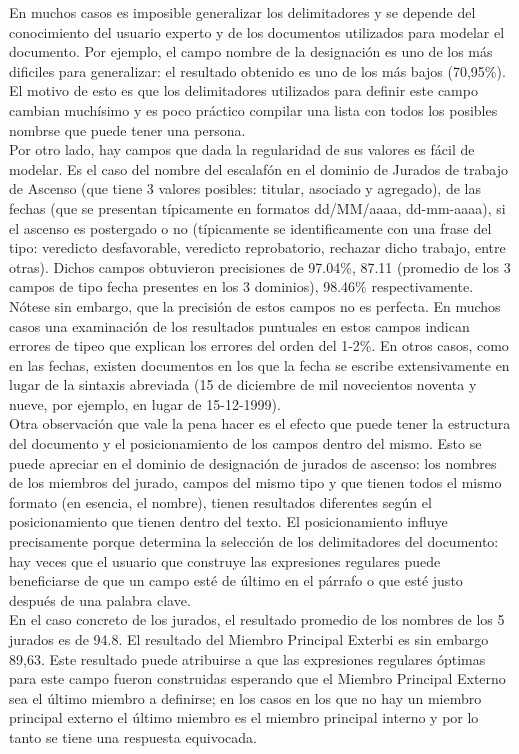 En muchos casos es imposible generalizar los delimitadores y se depende del conocimiento del usuario experto y de los documentos utilizados para modelar el documento. Por ejemplo, el campo nombre de la designación es uno de los más dificiles para generalizar: el resultado obtenido es uno de los más bajos (70,95\%). El motivo de esto es que los delimitadores utilizados para definir este campo cambian muchísimo y es poco práctico compilar una lista con todos los posibles nombrse que puede tener una persona. \\

Por otro lado, hay campos que dada la regularidad de sus valores es fácil de modelar. Es el caso del nombre del escalafón en el dominio de Jurados de trabajo de Ascenso (que tiene 3 valores posibles: titular, asociado y agregado), de las fechas (que se presentan típicamente en formatos dd/MM/aaaa, dd-mm-aaaa), si el ascenso es postergado o no (típicamente se identificamente con una frase del tipo: veredicto desfavorable, veredicto reprobatorio, rechazar dicho trabajo, entre otras). Dichos campos obtuvieron precisiones de 97.04\%, 87.11 (promedio de los 3 campos de tipo fecha presentes en los 3 dominios), 98.46\% respectivamente. Nótese sin embargo, que la precisión de estos campos no es perfecta. En muchos casos una examinación de los resultados puntuales en estos campos indican errores de tipeo que explican los errores del orden del 1-2\%. En otros casos, como en las fechas, existen documentos en los que la fecha se escribe extensivamente en lugar de la sintaxis abreviada (15 de diciembre de mil novecientos noventa y nueve, por ejemplo, en lugar de 15-12-1999). \\

Otra observación que vale la pena hacer es el efecto que puede tener la estructura del documento y el posicionamiento de los campos dentro del mismo. Esto se puede apreciar en el dominio de designación de jurados de ascenso: los nombres de los miembros del jurado, campos del mismo tipo y que tienen todos el mismo formato (en esencia, el nombre), tienen resultados diferentes según el posicionamiento que tienen dentro del texto. El posicionamiento influye precisamente porque determina la selección de los delimitadores del documento: hay veces que el usuario que construye las expresiones regulares puede beneficiarse de que un campo esté de último en el párrafo o que esté justo después de una palabra clave. \\

En el caso concreto de los jurados, el resultado promedio de los nombres de los 5 jurados es de 94.8. El resultado del Miembro Principal Exterbi es sin embargo 89,63. Este resultado puede atribuirse a que las expresiones regulares óptimas para este campo fueron construidas esperando que el Miembro Principal Externo sea el último miembro a definirse; en los casos en los que no hay un miembro principal externo el último miembro es el miembro principal interno y por lo tanto se tiene una respuesta equivocada. \\

